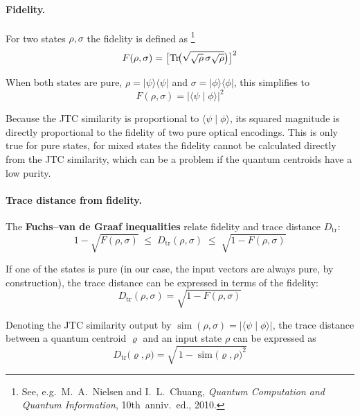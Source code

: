 \documentclass[twocolumn]{article} %
\begin{document}
\paragraph{Fidelity.}
For two states \(\rho,\sigma\) the fidelity is defined as%
\footnote{See, e.g.\ M.~A.~Nielsen and I.~L.~Chuang, \emph{Quantum Computation and Quantum Information}, 10th~anniv.\ ed., 2010.}
\begin{equation}
  F(\rho,\sigma)=
  \bigl[\operatorname{Tr}\!\bigl(
    \sqrt{\smash[b]{\sqrt{\rho}\,\sigma\sqrt{\rho}}}
  \bigr)\bigr]^{2}
  \label{eq:fidelity-general}
\end{equation}

When both states are pure, \(\rho=\lvert\psi\rangle\!\langle\psi\rvert\) and \(\sigma=\lvert\phi\rangle\!\langle\phi\rvert\), this simplifies to
\begin{equation}
  F(\rho,\sigma)=\lvert\langle\psi\mid\phi\rangle\rvert^{2}
  \label{eq:fidelity-pure}
\end{equation}

Because the JTC similarity is proportional to \(\langle\psi\mid\phi\rangle\), its squared magnitude is directly proportional to the fidelity of two pure optical encodings. This is only true for pure states, for mixed states the fidelity cannot be calculated directly from the JTC similarity, which can be a problem if the quantum centroids have a low purity.

\paragraph{Trace distance from fidelity.}
The \textbf{Fuchs–van de Graaf inequalities} relate fidelity and trace distance \(D_{\mathrm{tr}}\):
\begin{equation}
  1-\sqrt{F(\rho,\sigma)}
  \;\le\;
  D_{\mathrm{tr}}(\rho,\sigma)
  \;\le\;
  \sqrt{1-F(\rho,\sigma)}
  \label{eq:fuchs-vdg}
\end{equation}

If one of the states is pure (in our case, the input vectors are always pure, by construction), the trace distance can be expressed in terms of the fidelity:
\begin{equation}
  D_{\mathrm{tr}}(\rho,\sigma)=\sqrt{1-F(\rho,\sigma)}
  \label{eq:trace-from-fidelity}
\end{equation}

Denoting the JTC similarity output by \(\operatorname{sim}(\rho,\sigma)=\lvert\langle\psi\mid\phi\rangle\rvert\), the trace distance between a quantum centroid \(\varrho\) and an input state \(\rho\) can be expressed as
\begin{equation}
  D_{\mathrm{tr}}\!\bigl(\varrho,\rho\bigr)
  = \sqrt{\,1-\operatorname{sim}\!\bigl(\varrho,\rho\bigr)^{2}}
  \label{eq:trace-from-sim}
\end{equation}
\end{document}

